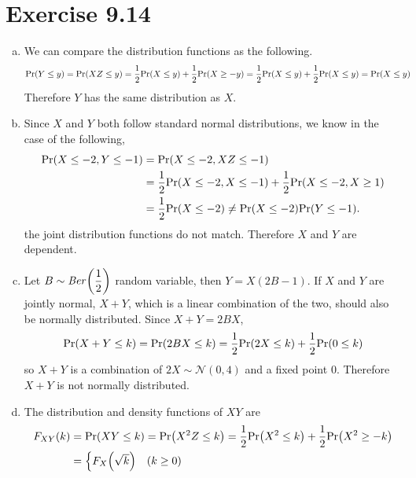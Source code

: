 \documentclass{article}
\begin{document}
\section*{Exercise 9.14}
\begin{enumerate}[(a)]
    \item We can compare the distribution functions as the following.
    \begin{align*}
        \mathrm{Pr}\qty(Y \leq y) &= \mathrm{Pr}\qty(XZ \leq y) = \frac{1}{2}\mathrm{Pr}\qty(X \leq y) + \frac{1}{2}\mathrm{Pr}\qty(X \geq -y) = \frac{1}{2}\mathrm{Pr}\qty(X \leq y) + \frac{1}{2}\mathrm{Pr}\qty(X \leq y) = \mathrm{Pr}\qty(X \leq y)
    \end{align*}
    Therefore $Y$ has the same distribution as $X$.
    \item Since $X$ and $Y$ both follow standard normal distributions, we know in the case of the following,  
    \begin{align*}
        \mathrm{Pr}\qty(X \leq -2, Y \leq -1) &= \mathrm{Pr}\qty(X \leq -2, XZ \leq -1) \\
        &= \frac{1}{2}\mathrm{Pr}\qty(X \leq -2, X \leq -1) + \frac{1}{2}\mathrm{Pr}\qty(X \leq -2, X \geq 1) \\
        &= \frac{1}{2}\mathrm{Pr}\qty(X \leq -2) \neq \mathrm{Pr}\qty(X \leq -2)\mathrm{Pr}\qty(Y \leq -1).
    \end{align*}
    the joint distribution functions do not match.
    Therefore $X$ and $Y$ are dependent.
    \item Let $B \sim \mathit{Ber}\qty(\dfrac{1}{2})$ random variable, then $Y = X(2B-1)$. 
    If $X$ and $Y$ are jointly normal, $X+Y$, which is a linear combination of the two, should also be normally distributed. 
    Since $X+Y = 2BX$, 
    $$\mathrm{Pr}\qty(X+Y \leq k) = \mathrm{Pr}\qty(2BX \leq k) = \frac{1}{2}\mathrm{Pr}\qty(2X \leq k) + \frac{1}{2}\mathrm{Pr}\qty(0 \leq k)$$
    so $X+Y$ is a combination of $2X \sim \mathcal{N}(0, 4)$ and a fixed point $0$. Therefore $X+Y$ is not normally distributed.
    \item 
    The distribution and density functions of $XY$ are
    \begin{align*}
        F_{XY}(k) &= \mathrm{Pr}\qty(XY \leq k) = \mathrm{Pr}\qty(X^2Z \leq k) = \frac{1}{2}\mathrm{Pr}\qty(X^2 \leq k) + \frac{1}{2}\mathrm{Pr}\qty(X^2 \geq -k) \\
        &= \begin{cases}
            F_{X}\qty(\sqrt{k}) & (k \geq 0) \\

\end{cases}
\end{align*}
\end{enumerate}
\end{document}
